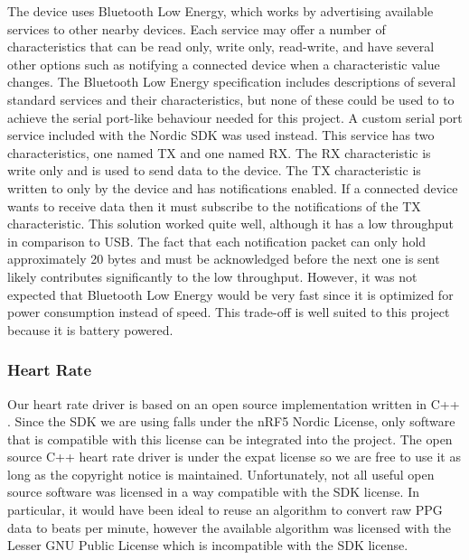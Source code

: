 The device uses Bluetooth Low Energy, which works by advertising
available services to other nearby devices. Each service may offer a number
of characteristics that can be read only, write only, read-write, and have 
several other options such as notifying a connected device when a characteristic
value changes. The Bluetooth Low Energy specification includes descriptions of several
standard services and their characteristics, but none of these could be used to
to achieve the serial port-like behaviour needed for this project. A custom
serial port service included with the Nordic SDK was used instead. This service
has two characteristics, one named TX and one named RX. The RX characteristic is
write only and is used to send data to the device. The TX characteristic is
written to only by the device and has notifications enabled. If a connected device
wants to receive data then it must subscribe to the notifications of the TX 
characteristic. This solution worked quite well, although it has a low 
throughput in comparison to USB. The fact that each notification packet can only 
hold approximately 20 bytes and must be acknowledged before the next one is 
sent likely contributes significantly to the low throughput. However, it was not expected
that Bluetooth Low Energy would be very fast since it is optimized for 
power consumption instead of speed. This trade-off is well suited to this project 
because it is battery powered.

\subsubsection{Heart Rate}

Our heart rate driver is based on an open source implementation written in
C++ \cite{max86150-ardino}. Since the SDK 
we are using falls under the nRF5
Nordic License, only software that is compatible with this license can be
integrated into the project. The open source C++ heart rate driver is under the
expat license so we are free to use it as long as the copyright notice is
maintained. Unfortunately, not all useful open source software was licensed in
a way compatible with the SDK license. In particular, it would have been ideal
to reuse an algorithm to convert raw PPG data to beats per minute, however the
available algorithm was licensed with the Lesser GNU Public
License \cite{wasp-os} which is incompatible with the SDK license.
